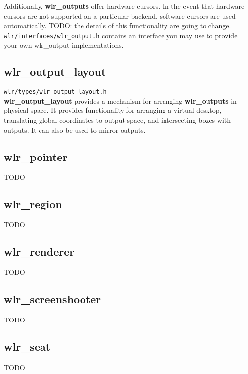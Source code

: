 \documentclass{article}
\newcommand{\code}[1]{\texttt{#1}}
\begin{document}
Additionally, \textbf{wlr_outputs} offer hardware cursors. In the event that
hardware cursors are not supported on a particular backend, software cursors
are used automatically. TODO: the details of this functionality are going to
change.\\

\code{wlr/interfaces/wlr_output.h} contains an interface you may use to
provide your own wlr_output implementations.

\subsection{wlr_output_layout}\label{wlr output layout}

\code{wlr/types/wlr_output_layout.h}\\

\textbf{wlr_output_layout} provides a mechanism for arranging
\textbf{wlr_outputs} in physical space. It provides functionality for arranging
a virtual desktop, translating global coordinates to output space, and
intersecting boxes with outputs. It can also be used to mirror outputs.

\subsection{wlr_pointer}\label{wlr pointer}

TODO

\subsection{wlr_region}\label{wlr region}

TODO

\subsection{wlr_renderer}\label{wlr renderer}

TODO

\subsection{wlr_screenshooter}\label{wlr screenshooter}

TODO

\subsection{wlr_seat}\label{wlr seat}

TODO
\end{document}
